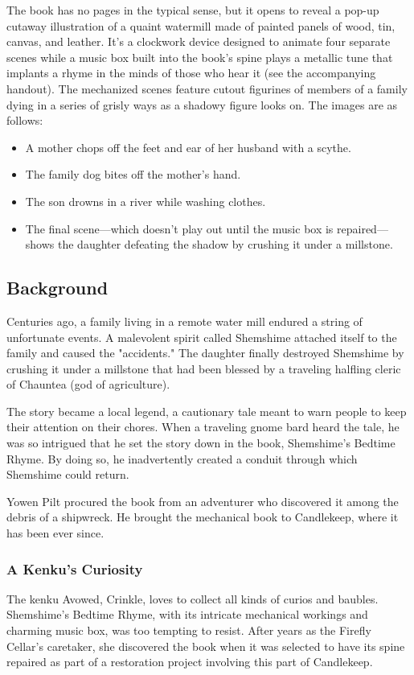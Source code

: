 \documentclass[10pt,a4paper,twoside,bg=print,twocolumn,openany,nodeprecatedcode]{dndbook}
\begin{document}
The book has no pages in the typical sense, but it opens to reveal a pop-up cutaway illustration of a quaint watermill made of painted panels of wood, tin, canvas, and leather. It's a clockwork device designed to animate four separate scenes while a music box built into the book's spine plays a metallic tune that implants a rhyme in the minds of those who hear it (see the accompanying handout). The mechanized scenes feature cutout figurines of members of a family dying in a series of grisly ways as a shadowy figure looks on. The images are as follows:


\begin{itemize}
\item A mother chops off the feet and ear of her husband with a scythe.
\item The family dog bites off the mother's hand.
\item The son drowns in a river while washing clothes.
\item The final scene—which doesn't play out until the music box is repaired—shows the daughter defeating the shadow by crushing it under a millstone.
\end{itemize}

\subsection{Background}
Centuries ago, a family living in a remote water mill endured a string of unfortunate events. A malevolent spirit called Shemshime attached itself to the family and caused the "accidents." The daughter finally destroyed Shemshime by crushing it under a millstone that had been blessed by a traveling halfling cleric of Chauntea (god of agriculture).

The story became a local legend, a cautionary tale meant to warn people to keep their attention on their chores. When a traveling gnome bard heard the tale, he was so intrigued that he set the story down in the book, Shemshime's Bedtime Rhyme. By doing so, he inadvertently created a conduit through which Shemshime could return.

Yowen Pilt procured the book from an adventurer who discovered it among the debris of a shipwreck. He brought the mechanical book to Candlekeep, where it has been ever since.

\subsubsection{A Kenku's Curiosity}
The kenku Avowed, Crinkle, loves to collect all kinds of curios and baubles. Shemshime's Bedtime Rhyme, with its intricate mechanical workings and charming music box, was too tempting to resist. After years as the Firefly Cellar's caretaker, she discovered the book when it was selected to have its spine repaired as part of a restoration project involving this part of Candlekeep.
\end{document}
